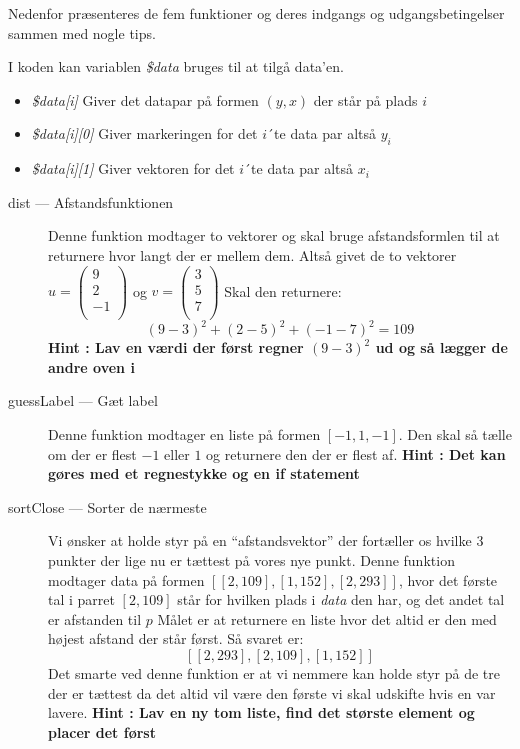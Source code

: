 \documentclass[14pt]{article}
\begin{document}
Nedenfor præsenteres de fem funktioner og deres indgangs og udgangsbetingelser
sammen med nogle tips.

I koden kan variablen \emph{\$data} bruges til at tilgå data'en.
\begin{itemize}
    \item \emph{\$data[i]} Giver det datapar på formen $(y,x)$ der står på
    plads $i$
    \item \emph{\$data[i][0]} Giver markeringen for det $i$´te data par altså
    $y_i$
    \item \emph{\$data[i][1]} Giver vektoren for det $i$´te data par altså
    $x_i$
\end{itemize}

    \begin{description}
        \item[dist --- Afstandsfunktionen]
        Denne funktion modtager to vektorer og skal bruge afstandsformlen til at
        returnere hvor langt der er mellem dem.
        Altså givet de to vektorer
        $u = \left(\begin{array}{c} 9\\ 2\\ -1\\\end{array} \right)$
        og
        $v = \left(\begin{array}{c} 3\\ 5\\ 7\\\end{array} \right)$
        Skal den returnere:
        $$
            (9-3)^2 + (2-5)^2 + (-1-7)^2 = 109
        $$
        \textbf{Hint : Lav en værdi der først regner $(9-3)^2$ ud og så lægger de andre oven i}\\

        \item[guessLabel --- Gæt label]
        Denne funktion modtager en liste på formen $[-1, 1, -1]$.
        Den skal så tælle om der er flest $-1$ eller $1$ og returnere den der er
        flest af.
        \textbf{Hint : Det kan gøres med et regnestykke og en if statement}\\

        \newpage

        \item[sortClose --- Sorter de nærmeste]
        Vi ønsker at holde styr på en ``afstandsvektor'' der fortæller os hvilke
        3 punkter der lige nu er tættest på vores nye punkt. Denne funktion
        modtager data på formen $[[2,109], [1,152], [2,293]]$, hvor det første tal
        i parret $[2,109]$ står for hvilken plads i \emph{data} den har, og
        det andet tal er afstanden til $p$
        Målet er at returnere en liste hvor det altid er den med højest afstand
        der står først. Så svaret er:
        $$
            [[2,293], [2,109], [1,152]]
        $$
        Det smarte ved denne funktion er at vi nemmere kan holde styr på de tre
        der er tættest da det altid vil være den første vi skal udskifte hvis en
        var lavere.
        \textbf{Hint : Lav en ny tom liste, find det største element og placer det
        først}\\



\end{description}
\end{document}
